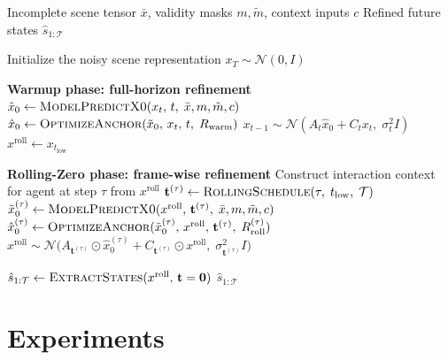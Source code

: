 \documentclass[10pt,twocolumn,letterpaper]{article}
\theoremstyle{plain}
\theoremstyle{remark}
\begin{document}
\begin{algorithm}[t]
\caption{Two-Phase Noise Scheduling with OMEGA Guidance}
\label{alg:omega_two_phase}
\begin{algorithmic}[1]
\Require Incomplete scene tensor $\bar{x}$, validity masks $m,\tilde{m}$, context inputs $c$
\Ensure Refined future states $\hat{s}_{1:\mathcal{T}}$

\State Initialize the noisy scene representation $x_T \sim \mathcal{N}(0,I)$

\Statex
\Statex \textbf{Warmup phase: full-horizon refinement}
    \State $\tilde{x}_0 \leftarrow \textsc{ModelPredictX0}(x_t,\, t,\; \bar{x}, m, \tilde{m}, c)$
    \State $\hat{x}_0 \leftarrow \textsc{OptimizeAnchor}(\tilde{x}_0,\, x_t,\, t,\; R_{\mathrm{warm}})$
    \State $x_{t-1} \sim \mathcal{N}\!\left(A_t \hat{x}_0 + C_t x_t,\; \sigma_t^2 I\right)$
\EndFor
\State $x^{\mathrm{roll}} \leftarrow x_{t_{\mathrm{low}}}$

\Statex
\Statex \textbf{Rolling-Zero phase: frame-wise refinement}
    \State Construct interaction context for agent at step $\tau$ from $x^{\mathrm{roll}}$ 
    \State $\mathbf{t}^{(\tau)} \leftarrow \textsc{RollingSchedule}(\tau,\; t_{\mathrm{low}},\; \mathcal{T})$
    \State $\tilde{x}_0^{(\tau)} \leftarrow \textsc{ModelPredictX0}(x^{\mathrm{roll}},\, \mathbf{t}^{(\tau)},\; \bar{x}, m, \tilde{m}, c)$
    \State $\hat{x}_0^{(\tau)} \leftarrow \textsc{OptimizeAnchor}(\tilde{x}_0^{(\tau)},\, x^{\mathrm{roll}},\, \mathbf{t}^{(\tau)},\; R_{\mathrm{roll}}^{(\tau)})$
    \State $x^{\mathrm{roll}} \sim
    \mathcal{N}\!\big(A_{\mathbf{t}^{(\tau)}} \odot \hat{x}_0^{(\tau)}
    + C_{\mathbf{t}^{(\tau)}} \odot x^{\mathrm{roll}},\;
    \sigma_{\mathbf{t}^{(\tau)}}^2 I\big)$
\EndFor

\State $\hat{s}_{1:\mathcal{T}} \leftarrow \textsc{ExtractStates}(x^{\mathrm{roll}},\, \mathbf{t}=\mathbf{0})$
\State \Return $\hat{s}_{1:\mathcal{T}}$
\end{algorithmic}
\end{algorithm}


\section{Experiments}
\label{app:exp}
\end{document}
